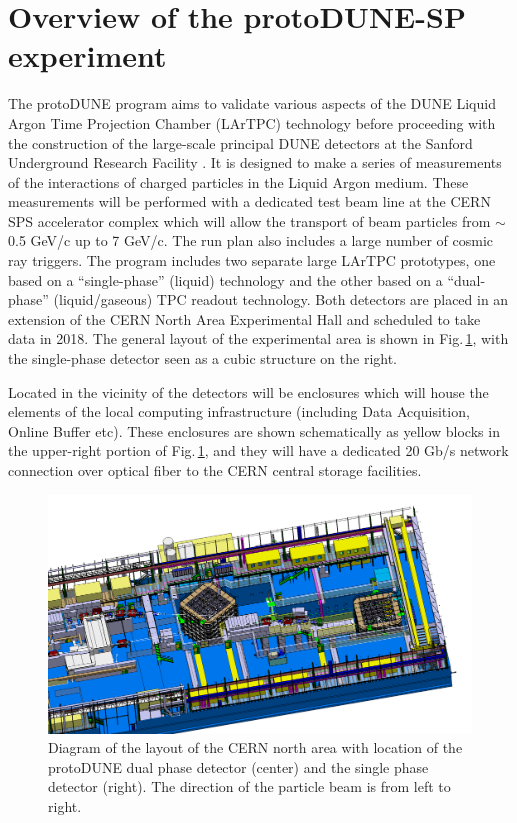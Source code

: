 \documentclass[12pt]{article}
\newcommand{\pd}{protoDUNE\xspace}
\begin{document}
\section{Overview of the protoDUNE-SP experiment}
The \pd program aims to validate various aspects of the DUNE  Liquid Argon Time Projection Chamber (LArTPC)  technology 
before proceeding with the construction of the large-scale principal DUNE detectors at the Sanford Underground Research
Facility \cite{cdrVol1, cdrVol4}. It  is designed to make a series of measurements of the interactions of
charged particles in the Liquid Argon medium.  These measurements will be performed with a dedicated test
beam line  at the CERN SPS accelerator complex which will allow the transport of beam particles from $\sim$0.5 GeV/c
up to 7 GeV/c. The run plan also includes a large number of cosmic ray triggers. The program includes
two separate large LArTPC prototypes, one based on a ``single-phase'' (liquid) technology and
the other based on a ``dual-phase'' (liquid/gaseous) TPC readout technology.
Both detectors are placed in an extension of the CERN North Area Experimental Hall and  scheduled
to take data in 2018. The general layout of the experimental area is shown in Fig.\,\ref{fig:np02np04}, with
the single-phase detector seen as a cubic structure on the right.

Located in the vicinity of the detectors will be enclosures which will house the elements of the local computing infrastructure
(including Data Acquisition, Online Buffer etc). These enclosures are shown schematically as yellow blocks in the
upper-right portion of Fig.\,\ref{fig:np02np04}, and they will have a dedicated 20 Gb/s
network connection over optical fiber to the CERN central storage facilities.

\begin{figure}[tb]
\centering\includegraphics[width=1.0\textwidth]{figures/np02np04.png}
\caption{\label{fig:np02np04}Diagram of the layout of the CERN north area with
  location of the protoDUNE dual phase detector (center) and the single
  phase detector (right). The direction of the particle beam is from left to right.}
\end{figure}
\end{document}
